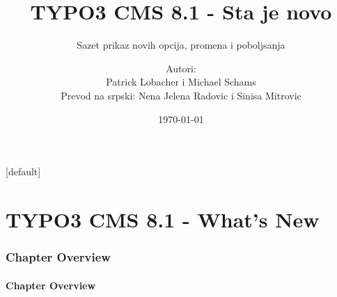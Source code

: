 \documentclass[t]{beamer}
\title{TYPO3 CMS 8.1 - Sta je novo}
\subtitle{Sazet prikaz novih opcija, promena i poboljsanja}
\author{
	\centerline{Autori:}
	\centerline{Patrick Lobacher i Michael Schams}
	\centerline{Prevod na srpski: Nena Jelena Radovic i Sinisa Mitrovic} 
}
\date{\today}
\begin{document}
\sharefont


\begingroup
	[default]
	\begin{frame}
		\titlepage
	\end{frame}
\endgroup


\section*{TYPO3 CMS 8.1 - What's New}
\begin{frame}[fragile]
	\frametitle{Chapter Overview}
	\framesubtitle{Chapter Overview}

	\tableofcontents

\end{frame}










\end{document}
